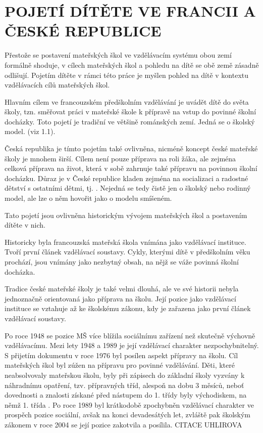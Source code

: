 \chapter{POJETÍ DÍTĚTE VE FRANCII A ČESKÉ REPUBLICE}

Přestože se postavení mateřských škol ve vzdělávacím systému obou zemí formálně shoduje, v cílech mateřských škol a pohledu na dítě se obě země zásadně odlišují. Pojetím dítěte v rámci této práce je myšlen pohled na dítě v kontextu vzdělávacích cílů mateřských škol. 

Hlavním cílem ve francouzském předškolním vzdělávání je uvádět dítě do světa školy, tzn. směřovat práci v mateřské škole k přípravě na vstup do povinné školní docházky. Toto pojetí je tradiční ve většině románských zemí. Jedná se o školský model. (viz 1.1).

 Česká republika je tímto pojetím také ovlivněna, nicméně koncept české mateřské školy je mnohem širší. Cílem není pouze příprava na roli žáka, ale zejména celková příprava na život, která v sobě zahrnuje také přípravu na povinnou školní docházku. Důraz je v České republice kladen zejména na socializaci a radostné dětství s ostatními dětmi, tj. . Nejedná se tedy čistě jen o školský nebo rodinný model, ale lze o něm hovořit jako o modelu smíšeném.

Tato pojetí jsou ovlivněna historickým vývojem mateřských škol a postavením dítěte v nich.

Historicky byla francouzská mateřská škola vnímána jako vzdělávací instituce. Tvoří první článek vzdělávací soustavy. Cykly, kterými dítě v předškolním věku prochází, jsou vnímány jako nezbytný obsah, na nějž se váže povinná školní docházka. 

Tradice české mateřské školy je také velmi dlouhá, ale ve své historii nebyla jednoznačně orientovaná jako příprava na školu. Její pozice jako vzdělávací instituce se vztahuje až ke školskému zákonu, kdy je zařazena jako první článek vzdělávací soustavy. 

 Po roce 1948 se pozice MŠ více blížila sociálnímu zařízení než skutečně výchovně vzdělávacímu. Mezi lety 1948 a 1989 je její vzdělávací charakter nezpochybnitelný. S přijetím dokumentu  v roce 1976 byl posílen aspekt přípravy na školu. Cíl mateřských škol byl zúžen na přípravu pro povinné vzdělávání. Děti, které neabsolvovaly mateřskou školu, byly při zápisech do základní školy vyzvány k náhradnímu opatření, tzv. přípravných tříd, alespoň na dobu 3 měsíců, neboť dovednosti a znalosti získané před nástupem do 1. třídy byly východiskem, na němž 1. třída . Po roce 1989 byl krátkodobě zpochybněn vzdělávací charakter ve prospěch pozice sociální, avšak na konci devadesátých let, zvláště pak školským zákonem v roce 2004 se její pozice zakotvila a posílila. CITACE UHLIROVA

